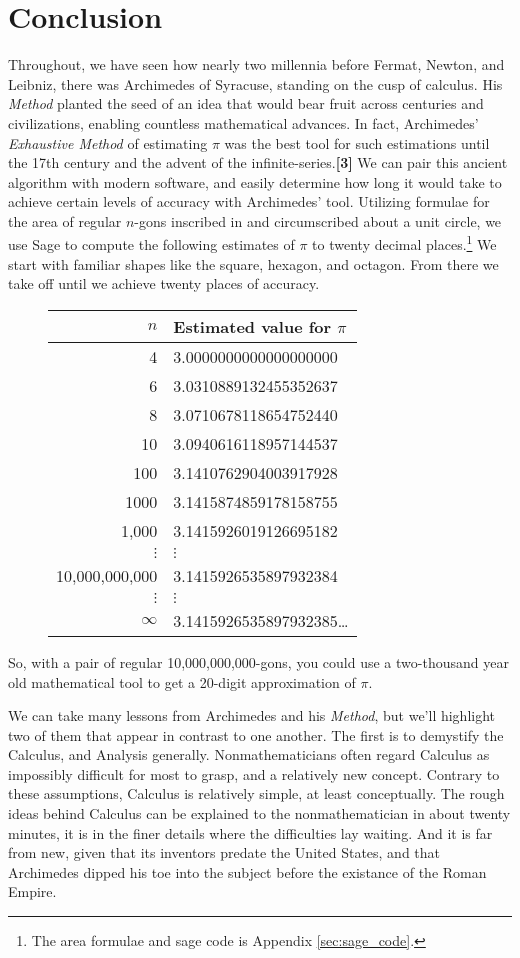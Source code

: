 \documentclass[letterpaper, 12pt]{amsart}
\theoremstyle{definition}  %
\begin{document}
	\section{Conclusion}
	\label{sec:conclusion}
	Throughout, we have seen how nearly two millennia before Fermat, Newton, and Leibniz, there was Archimedes of Syracuse, standing on the cusp of calculus.
	His \textit{Method} planted the seed of an idea that would bear fruit across centuries and civilizations, enabling countless mathematical advances.
	In fact, Archimedes' \textit{Exhaustive Method} of estimating $\pi$ was the best tool for such estimations until the 17th century and the advent of the infinite-series.\textbf{[3]}
	We can pair this ancient algorithm with modern software, and easily determine how long it would take to achieve certain levels of accuracy with Archimedes' tool.
	Utilizing formulae for the area of regular $n$-gons inscribed in and circumscribed about a unit circle, we use Sage to compute the following estimates of $\pi$ to twenty decimal places.\footnote{The area formulae and sage code is Appendix \ref{sec:sage_code}.}
	We start with familiar shapes like the square, hexagon, and octagon.
	From there we take off until we achieve twenty places of accuracy.
		\begin{figure}[h]
			\begin{tabular}{r|l}
				$n$ & Estimated value for $\pi$ \\
				\hline
				4 & 3.0000000000000000000 \\
				6 & 3.0310889132455352637 \\
				8 & 3.0710678118654752440 \\
				10 & 3.0940616118957144537 \\
				100 & 3.1410762904003917928 \\
				1000 & 3.1415874859178158755 \\
				1,000 & 3.1415926019126695182 \\
				$\vdots$ & $\vdots$ \\
				10,000,000,000 & 3.1415926535897932384 \\
				$\vdots$ & $\vdots$ \\
				$\infty$ & 3.1415926535897932385\dots 
			\end{tabular}
		\end{figure}

	So, with a pair of regular 10,000,000,000-gons, you could use a two-thousand year old mathematical tool to get a 20-digit approximation of $\pi$.

	We can take many lessons from Archimedes and his \textit{Method}, but we'll highlight two of them that appear in contrast to one another.
	The first is to demystify the Calculus, and Analysis generally.
	Nonmathematicians often regard Calculus as impossibly difficult for most to grasp, and a relatively new concept.
	Contrary to these assumptions, Calculus is relatively simple, at least conceptually. 
	The rough ideas behind Calculus can be explained to the nonmathematician in about twenty minutes, it is in the finer details where the difficulties lay waiting.
	And it is far from new, given that its inventors predate the United States, and that Archimedes dipped his toe into the subject before the existance of the Roman Empire.
	
\end{document}
